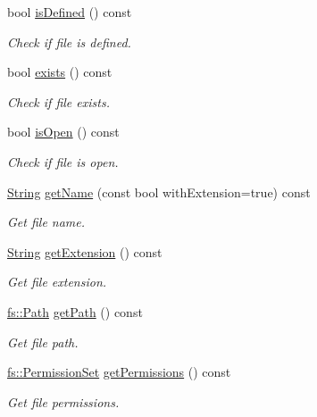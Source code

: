 \begin{DoxyCompactItemize}
bool \hyperlink{classostk_1_1core_1_1fs_1_1_file_a35d96a10069d22bc45385fdad04bbe00}{is\+Defined} () const
\begin{DoxyCompactList}\small\item\em Check if file is defined. \end{DoxyCompactList}\item 
bool \hyperlink{classostk_1_1core_1_1fs_1_1_file_afcd8f1b98fbbfe0736f91ddb5e14c4c4}{exists} () const
\begin{DoxyCompactList}\small\item\em Check if file exists. \end{DoxyCompactList}\item 
bool \hyperlink{classostk_1_1core_1_1fs_1_1_file_a6e719c79ddb035206a6b2ce808258f2e}{is\+Open} () const
\begin{DoxyCompactList}\small\item\em Check if file is open. \end{DoxyCompactList}\item 
\hyperlink{classostk_1_1core_1_1types_1_1_string}{String} \hyperlink{classostk_1_1core_1_1fs_1_1_file_ac3120c49b69a93fa364dba012a0d507a}{get\+Name} (const bool with\+Extension=true) const
\begin{DoxyCompactList}\small\item\em Get file name. \end{DoxyCompactList}\item 
\hyperlink{classostk_1_1core_1_1types_1_1_string}{String} \hyperlink{classostk_1_1core_1_1fs_1_1_file_a91123937e378c905d973998e13b61493}{get\+Extension} () const
\begin{DoxyCompactList}\small\item\em Get file extension. \end{DoxyCompactList}\item 
\hyperlink{classostk_1_1core_1_1fs_1_1_path}{fs\+::\+Path} \hyperlink{classostk_1_1core_1_1fs_1_1_file_a4bdf46eada08ce70e2a408606aab94e4}{get\+Path} () const
\begin{DoxyCompactList}\small\item\em Get file path. \end{DoxyCompactList}\item 
\hyperlink{classostk_1_1core_1_1fs_1_1_permission_set}{fs\+::\+Permission\+Set} \hyperlink{classostk_1_1core_1_1fs_1_1_file_aded4a0f23b9c81f12e2ce3f4e95f3bd0}{get\+Permissions} () const
\begin{DoxyCompactList}\small\item\em Get file permissions. \end{DoxyCompactList}\item 

\end{DoxyCompactItemize}

